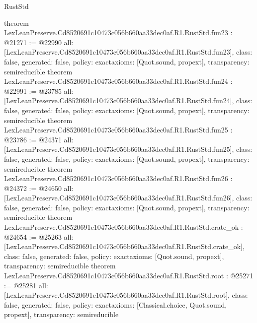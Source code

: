 \begin{lexlean}{RustStd}
\begin{coremodule}
{}
theorem LexLeanPreserve.Cd8520691c10473c056b660aa33dec0af.R1.RustStd.fun23 : @21271 := @22990 {
  all: [LexLeanPreserve.Cd8520691c10473c056b660aa33dec0af.R1.RustStd.fun23],
  class: false,
  generated: false,
  policy: exact{axioms: [Quot.sound, propext]},
  transparency: semireducible
}
theorem LexLeanPreserve.Cd8520691c10473c056b660aa33dec0af.R1.RustStd.fun24 : @22991 := @23785 {
  all: [LexLeanPreserve.Cd8520691c10473c056b660aa33dec0af.R1.RustStd.fun24],
  class: false,
  generated: false,
  policy: exact{axioms: [Quot.sound, propext]},
  transparency: semireducible
}
theorem LexLeanPreserve.Cd8520691c10473c056b660aa33dec0af.R1.RustStd.fun25 : @23786 := @24371 {
  all: [LexLeanPreserve.Cd8520691c10473c056b660aa33dec0af.R1.RustStd.fun25],
  class: false,
  generated: false,
  policy: exact{axioms: [Quot.sound, propext]},
  transparency: semireducible
}
theorem LexLeanPreserve.Cd8520691c10473c056b660aa33dec0af.R1.RustStd.fun26 : @24372 := @24650 {
  all: [LexLeanPreserve.Cd8520691c10473c056b660aa33dec0af.R1.RustStd.fun26],
  class: false,
  generated: false,
  policy: exact{axioms: [Quot.sound, propext]},
  transparency: semireducible
}
theorem LexLeanPreserve.Cd8520691c10473c056b660aa33dec0af.R1.RustStd.crate_ok : @24654 := @25263 {
  all: [LexLeanPreserve.Cd8520691c10473c056b660aa33dec0af.R1.RustStd.crate_ok],
  class: false,
  generated: false,
  policy: exact{axioms: [Quot.sound, propext]},
  transparency: semireducible
}
theorem LexLeanPreserve.Cd8520691c10473c056b660aa33dec0af.R1.RustStd.root : @25271 := @25281 {
  all: [LexLeanPreserve.Cd8520691c10473c056b660aa33dec0af.R1.RustStd.root],
  class: false,
  generated: false,
  policy: exact{axioms: [Classical.choice, Quot.sound, propext]},
  transparency: semireducible
}


\end{coremodule}
\end{lexlean}
